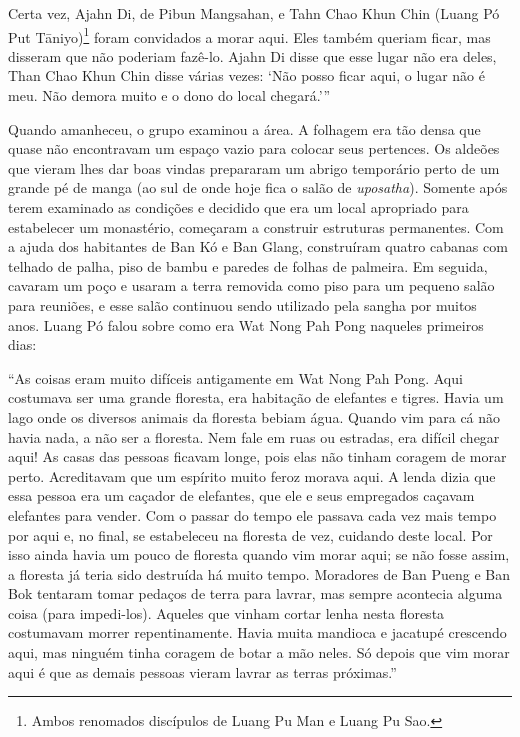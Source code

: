 Certa vez, Ajahn Di, de Pibun Mangsahan, e Tahn Chao Khun Chin (Luang Pó
Put Tāniyo)\footnote{Ambos renomados discípulos de Luang Pu Man e Luang
  Pu Sao.} foram convidados a morar aqui. Eles também queriam ficar, mas
disseram que não poderiam fazê-lo. Ajahn Di disse que esse lugar não era
deles, Than Chao Khun Chin disse várias vezes: `Não posso ficar aqui, o
lugar não é meu. Não demora muito e o dono do local chegará.'''

Quando amanheceu, o grupo examinou a área. A folhagem era tão densa que
quase não encontravam um espaço vazio para colocar seus pertences. Os
aldeões que vieram lhes dar boas vindas prepararam um abrigo temporário
perto de um grande pé de manga (ao sul de onde hoje fica o salão de
\emph{uposatha}). Somente após terem examinado as condições e decidido
que era um local apropriado para estabelecer um monastério, começaram a
construir estruturas permanentes. Com a ajuda dos habitantes de Ban Kó e
Ban Glang, construíram quatro cabanas com telhado de palha, piso de
bambu e paredes de folhas de palmeira. Em seguida, cavaram um poço e
usaram a terra removida como piso para um pequeno salão para reuniões, e
esse salão continuou sendo utilizado pela sangha por muitos anos. Luang
Pó falou sobre como era Wat Nong Pah Pong naqueles primeiros dias:

``As coisas eram muito difíceis antigamente em Wat Nong Pah Pong. Aqui
costumava ser uma grande floresta, era habitação de elefantes e tigres.
Havia um lago onde os diversos animais da floresta bebiam água. Quando
vim para cá não havia nada, a não ser a floresta. Nem fale em ruas ou
estradas, era difícil chegar aqui! As casas das pessoas ficavam longe,
pois elas não tinham coragem de morar perto. Acreditavam que um espírito
muito feroz morava aqui. A lenda dizia que essa pessoa era um caçador de
elefantes, que ele e seus empregados caçavam elefantes para vender. Com
o passar do tempo ele passava cada vez mais tempo por aqui e, no final,
se estabeleceu na floresta de vez, cuidando deste local. Por isso ainda
havia um pouco de floresta quando vim morar aqui; se não fosse assim, a
floresta já teria sido destruída há muito tempo. Moradores de Ban Pueng
e Ban Bok tentaram tomar pedaços de terra para lavrar, mas sempre
acontecia alguma coisa (para impedi-los). Aqueles que vinham cortar
lenha nesta floresta costumavam morrer repentinamente. Havia muita
mandioca e jacatupé crescendo aqui, mas ninguém tinha coragem de botar a
mão neles. Só depois que vim morar aqui é que as demais pessoas vieram
lavrar as terras próximas.''

